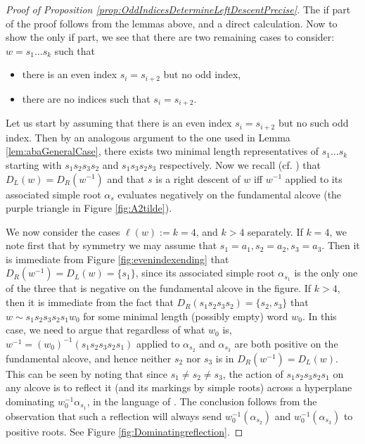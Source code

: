 \documentclass{article}
\begin{document}
\begin{proof}[Proof of Proposition \ref{prop:OddIndicesDetermineLeftDescentPrecise}]
    The if part of the proof follows from the lemmas above, and a direct calculation. Now to show the only if part, we see that there are two remaining cases to consider: $w=s_1\ldots s_k$ such that
    \begin{itemize}
        \item there is an even index $s_i = s_{i+2}$ but no odd index,
        \item there are no indices such that $s_i=s_{i+2}$.
    \end{itemize}
    \par Let us start by assuming that there is an even index $s_i = s_{i+2}$ but no such odd index. Then by an analogous argument to the one used in Lemma \ref{lem:abaGeneralCase}, there exists two minimal length representatives of $s_1\ldots s_k$ starting with $s_1s_2s_3s_2$ and $s_1s_3s_2s_3$ respectively. Now we recall (cf. \citet{casselman2008computationcoxetergroupsii}) that $D_L(w) = D_R(w^{-1})$ and that $s$ is a right descent of $w$ iff $w^{-1}$ applied to its associated simple root $\alpha_s$ evaluates negatively on the fundamental alcove (the purple triangle in Figure \ref{fig:A2tilde}). 
    
    We now consider the cases $\ell(w) := k=4$, and $k > 4$ separately. If $k=4$, we note first that by symmetry we may assume that $s_1 = a_1, s_2 = a_2, s_3 = a_3$. Then it is immediate from Figure \ref{fig:evenindexending} that $D_R(w^{-1}) = D_L(w) = \{s_1\}$, since its associated simple root $\alpha_{s_1}$ is the only one of the three that is negative on the fundamental alcove in the figure. If $k > 4$, then it is immediate from the fact that $D_R(s_1s_2s_3s_2) = \{s_2,s_3\}$ that $w \sim s_1s_2s_3s_2s_1w_0$ for some minimal length (possibly empty) word $w_0$. In this case, we need to argue that regardless of what $w_0$ is, $w^{-1} = (w_0)^{-1}(s_1s_2s_3s_2s_1)$ applied to $\alpha_{s_2}$ and $\alpha_{s_3}$ are both positive on the fundamental alcove, and hence neither $s_2$ nor $s_3$ is in $D_R(w^{-1}) = D_L(w)$. This can be seen by noting that since $s_1 \neq s_2 \neq s_3$, the action of $s_1s_2s_3s_2s_1$ on any alcove is to reflect it (and its markings by simple roots) across a hyperplane dominating $w_0^{-1}\alpha_{s_1}$, in the language of \citet{casselman2008computationcoxetergroupsii}. The conclusion follows from the observation that such a reflection will always send $w_0^{-1}(\alpha_{s_2})$ and $w_0^{-1}(\alpha_{s_3})$ to positive roots. See Figure \ref{fig:Dominatingreflection}.


\end{proof}
\end{document}
